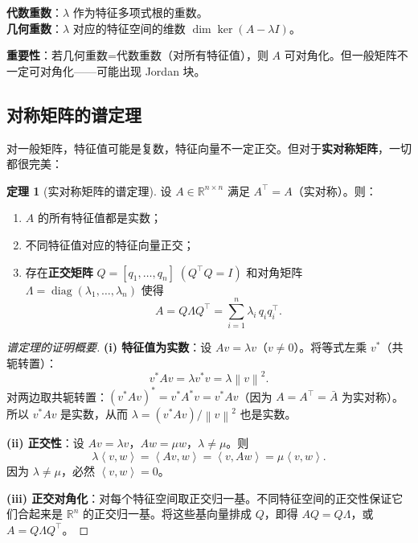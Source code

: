\documentclass[12pt,a4paper]{ctexart}
\theoremstyle{definition}
\newtheorem{theorem}{定理}[section]
\theoremstyle{plain}
\newcommand{\R}{\mathbb{R}}
\newcommand{\diag}{\operatorname{diag}}
\newcommand{\norm}[1]{\left\lVert #1 \right\rVert}
\newcommand{\ip}[2]{\left\langle #1,#2 \right\rangle}
\begin{document}
\textbf{代数重数}：$\lambda$ 作为特征多项式根的重数。\\
\textbf{几何重数}：$\lambda$ 对应的特征空间的维数 $\dim\ker(A-\lambda I)$。

\textbf{重要性}：若几何重数=代数重数（对所有特征值），则 $A$ 可对角化。但一般矩阵不一定可对角化——可能出现 Jordan 块。

\subsection{对称矩阵的谱定理}

对一般矩阵，特征值可能是复数，特征向量不一定正交。但对于\textbf{实对称矩阵}，一切都很完美：

\begin{theorem}[实对称矩阵的谱定理]\label{thm:spectral}
  设 $A\in\R^{n\times n}$ 满足 $A^\top=A$（实对称）。则：
  \begin{enumerate}[label=(\roman*)]
    \item $A$ 的所有特征值都是实数；
    \item 不同特征值对应的特征向量正交；
    \item 存在\textbf{正交矩阵} $Q=[q_1,\ldots,q_n]\;(Q^\top Q=I)$ 和对角矩阵 $\Lambda=\diag(\lambda_1,\ldots,\lambda_n)$ 使得
    \begin{equation}\label{eq:spectral}
      A = Q\Lambda Q^\top = \sum_{i=1}^n \lambda_i\, q_i q_i^\top.
    \end{equation}
  \end{enumerate}
\end{theorem}

\begin{proof}[谱定理的证明概要]
  \textbf{(i) 特征值为实数}：设 $Av=\lambda v$（$v\neq0$）。将等式左乘 $v^*$（共轭转置）：
  \[
    v^*Av = \lambda v^*v = \lambda \norm{v}^2.
  \]
  对两边取共轭转置：$(v^*Av)^* = v^*A^*v = v^*Av$（因为 $A=A^\top=\bar A$ 为实对称）。\\
  所以 $v^*Av$ 是实数，从而 $\lambda = (v^*Av)/\norm{v}^2$ 也是实数。

  \textbf{(ii) 正交性}：设 $Av=\lambda v$，$Aw=\mu w$，$\lambda\neq\mu$。则
  \[
    \lambda\ip{v}{w} = \ip{Av}{w} = \ip{v}{Aw} = \mu\ip{v}{w}.
  \]
  因为 $\lambda\neq\mu$，必然 $\ip{v}{w}=0$。

  \textbf{(iii) 正交对角化}：对每个特征空间取正交归一基。不同特征空间的正交性保证它们合起来是 $\R^n$ 的正交归一基。将这些基向量排成 $Q$，即得 $AQ=Q\Lambda$，或 $A=Q\Lambda Q^\top$。
\end{proof}
\end{document}
